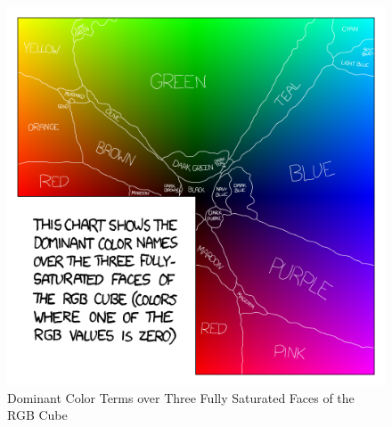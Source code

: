 \begin{figure}[hbt!]\centering
\includegraphics[width=.6\textwidth]{image/general/xkcd.png}
\caption{Dominant Color Terms over Three Fully Saturated Faces of the RGB Cube}
\label{fig:xkcd}
\end{figure}







